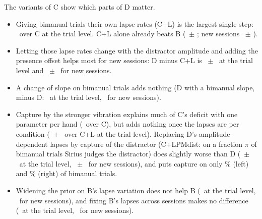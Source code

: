 The variants of C show which parts of D matter.
\begin{itemize}
\item Giving bimanual trials their own lapse rates (C+L) is the largest single step: \LvsCTrial\ over C at the trial level. C+L alone already beats B (\LvsBTrial\ $\pm$ \LvsBTrialSE; new sessions \LvsBLoso\ $\pm$ \LvsBLosoSE).
\item Letting those lapse rates change with the distractor amplitude and adding the presence offset helps most for new sessions: D minus C+L is \DvsLTrial\ $\pm$ \DvsLTrialSE\ at the trial level and \DvsLLoso\ $\pm$ \DvsLLosoSE\ for new sessions.
\item A change of slope on bimanual trials adds nothing (D with a bimanual slope, minus D: \SvsDTrial\ at the trial level, \SvsDLoso\ for new sessions).
\item Capture by the stronger vibration explains much of C's deficit with one parameter per hand (\MmaxvsCTrial\ over C), but adds nothing once the lapses are per condition (\LMmaxvsLTrial\ $\pm$ \LMmaxvsLTrialSE\ over C+L at the trial level). Replacing D's amplitude-dependent lapses by capture of the distractor (C+LPMdist: on a fraction $\pi$ of bimanual trials Sirius judges the distractor) does slightly worse than D (\CapturevsDTrial\ $\pm$ \CapturevsDTrialSE\ at the trial level, \CapturevsDLoso\ $\pm$ \CapturevsDLosoSE\ for new sessions), and puts capture on only \piCapturePctLeft\% (left) and \piCapturePctRight\% (right) of bimanual trials.
\item Widening the prior on B's lapse variation does not help B (\BwidevsBTrial\ at the trial level, \BwidevsBLoso\ for new sessions), and fixing B's lapses across sessions makes no difference (\BfixvsBTrial\ at the trial level, \BfixvsBLoso\ for new sessions).
\end{itemize}

